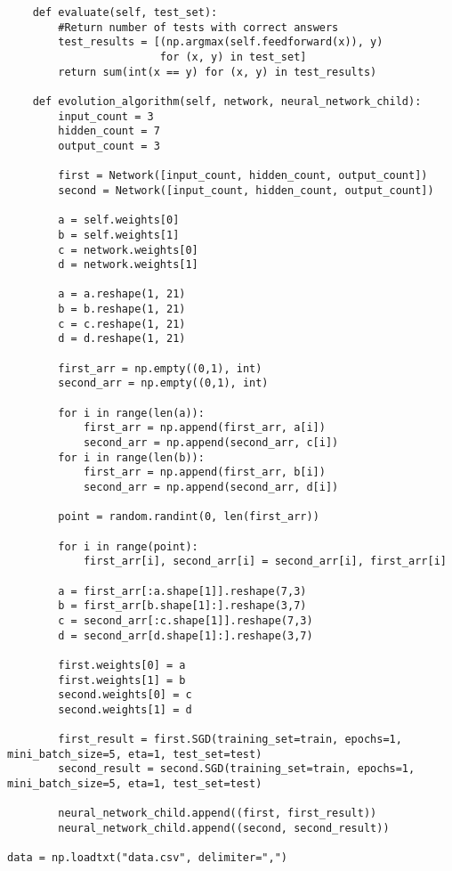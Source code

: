 \begin{lstlisting}
    def evaluate(self, test_set):
        #Return number of tests with correct answers
        test_results = [(np.argmax(self.feedforward(x)), y)
                        for (x, y) in test_set]
        return sum(int(x == y) for (x, y) in test_results)

    def evolution_algorithm(self, network, neural_network_child):
        input_count = 3
        hidden_count = 7
        output_count = 3

        first = Network([input_count, hidden_count, output_count])
        second = Network([input_count, hidden_count, output_count])
        
        a = self.weights[0]
        b = self.weights[1]
        c = network.weights[0]
        d = network.weights[1]
                
        a = a.reshape(1, 21)
        b = b.reshape(1, 21)
        c = c.reshape(1, 21)
        d = d.reshape(1, 21)
        
        first_arr = np.empty((0,1), int)
        second_arr = np.empty((0,1), int)

        for i in range(len(a)):
            first_arr = np.append(first_arr, a[i])
            second_arr = np.append(second_arr, c[i])
        for i in range(len(b)):
            first_arr = np.append(first_arr, b[i])
            second_arr = np.append(second_arr, d[i])
        
        point = random.randint(0, len(first_arr))
    
        for i in range(point):
            first_arr[i], second_arr[i] = second_arr[i], first_arr[i]
            
        a = first_arr[:a.shape[1]].reshape(7,3)
        b = first_arr[b.shape[1]:].reshape(3,7)
        c = second_arr[:c.shape[1]].reshape(7,3)
        d = second_arr[d.shape[1]:].reshape(3,7)
        
        first.weights[0] = a
        first.weights[1] = b
        second.weights[0] = c
        second.weights[1] = d
        
        first_result = first.SGD(training_set=train, epochs=1, mini_batch_size=5, eta=1, test_set=test)
        second_result = second.SGD(training_set=train, epochs=1, mini_batch_size=5, eta=1, test_set=test)
        
        neural_network_child.append((first, first_result))
        neural_network_child.append((second, second_result))

data = np.loadtxt("data.csv", delimiter=",")


\end{lstlisting}
